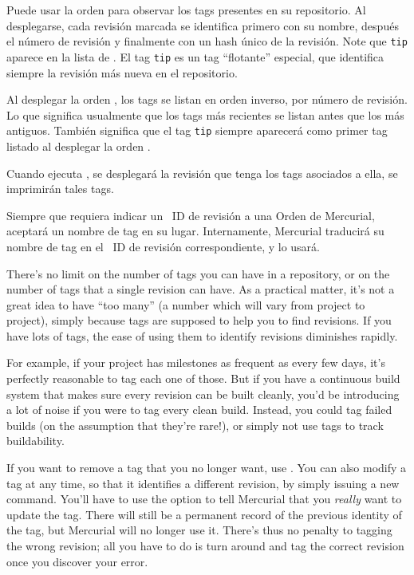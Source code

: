 Puede usar la orden  para observar los tags presentes en
su repositorio. Al desplegarse, cada revisión marcada se identifica
primero con su nombre, después el número de revisión y finalmente con
un hash único de la revisión.
Note que \texttt{tip} aparece en la lista de .  El tag
\texttt{tip} es un tag ``flotante'' especial, que identifica siempre
la revisión más nueva en el repositorio.

Al desplegar la orden , los tags se listan en orden
inverso, por número de revisión. Lo que significa usualmente que los
tags más recientes se listan antes que los más antiguos. También
significa que el tag \texttt{tip} siempre aparecerá como primer tag
listado al desplegar la orden .

Cuando ejecuta , se desplegará la revisión que tenga los
tags asociados a ella, se imprimirán tales tags.

Siempre que requiera indicar un ~ID de revisión a una Orden de
Mercurial, aceptará un nombre de tag en su lugar.  Internamente,
Mercurial traducirá su nombre de tag en el ~ID de revisión
correspondiente, y lo usará.

There's no limit on the number of tags you can have in a repository,
or on the number of tags that a single revision can have.  As a
practical matter, it's not a great idea to have ``too many'' (a number
which will vary from project to project), simply because tags are
supposed to help you to find revisions.  If you have lots of tags, the
ease of using them to identify revisions diminishes rapidly.

For example, if your project has milestones as frequent as every few
days, it's perfectly reasonable to tag each one of those.  But if you
have a continuous build system that makes sure every revision can be
built cleanly, you'd be introducing a lot of noise if you were to tag
every clean build.  Instead, you could tag failed builds (on the
assumption that they're rare!), or simply not use tags to track
buildability.

If you want to remove a tag that you no longer want, use
.  
You can also modify a tag at any time, so that it identifies a
different revision, by simply issuing a new  command.
You'll have to use the  option to tell Mercurial that
you \emph{really} want to update the tag.
There will still be a permanent record of the previous identity of the
tag, but Mercurial will no longer use it.  There's thus no penalty to
tagging the wrong revision; all you have to do is turn around and tag
the correct revision once you discover your error.

